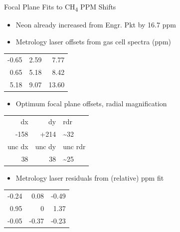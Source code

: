 \documentclass[10pt]{beamer}
\begin{document}
\begin{frame}[label={sec:orgdc40122}]{Focal Plane Fits to CH\textsubscript{4} PPM Shifts}
\begin{small}

\begin{itemize}
\item Neon already increased from Engr. Pkt by 16.7 ppm

\item Metrology laser offsets from gas cell spectra (ppm)
\end{itemize}
\begin{center}
\begin{tabular}{rrr}
-0.65 & 2.59 & 7.77\\
0.65 & 5.18 & 8.42\\
5.18 & 9.07 & 13.60\\
\end{tabular}
\end{center}

\begin{itemize}
\item Optimum focal plane offsets, radial magnification
\end{itemize}
\begin{center}
\begin{tabular}{rrl}
dx & dy & rdr\\
-158 & +214 & \textasciitilde{}32\\
\hline
unc   dx & unc   dy & unc rdr\\
38 & 38 & \textasciitilde{}25\\
\end{tabular}
\end{center}

\begin{itemize}
\item Metrology laser residuals from (relative) ppm fit
\end{itemize}
\begin{center}
\begin{tabular}{rrr}
-0.24 & 0.08 & -0.49\\
0.95 & 0 & 1.37\\
-0.05 & -0.37 & -0.23\\
\end{tabular}
\end{center}
\end{small}
\end{frame}
\end{document}
